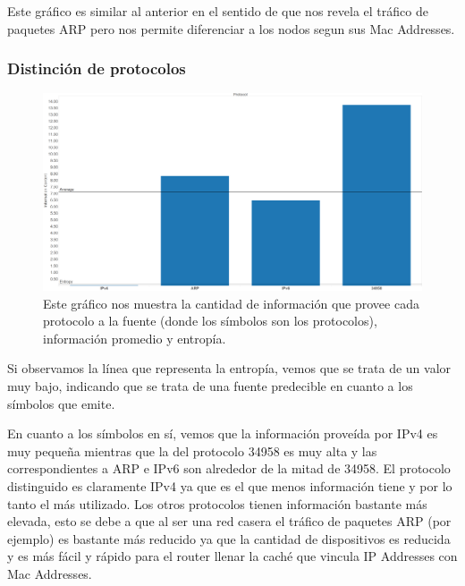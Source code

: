 \documentclass{article}
\theoremstyle{definition}
\theoremstyle{remark}
\begin{document}
Este gráfico es similar al anterior en el sentido de que nos revela el tráfico de paquetes ARP pero nos permite diferenciar a los nodos segun sus Mac Addresses.

\subsubsection{Distinción de protocolos}
\begin{figure}[H]
    \centering
    \includegraphics[width=1\textwidth]{../captures/CasaGerman/Protocol PDF Dashboard.png}
    \caption{Este gráfico nos muestra la cantidad de información que provee cada protocolo a la fuente (donde los símbolos son los protocolos), información promedio y entropía.}
    \label{fig:mesh1}
\end{figure}
Si observamos la línea que representa la entropía, vemos que se trata de un valor muy bajo, indicando que se trata de una fuente predecible en cuanto a los símbolos que emite.
\par En cuanto a los símbolos en sí, vemos que la información proveída por IPv4 es muy pequeña mientras que la del protocolo 34958 es muy alta y las correspondientes a ARP e IPv6 son alrededor de la mitad de 34958. El protocolo distinguido es claramente IPv4 ya que es el que menos información tiene y por lo tanto el más utilizado. Los otros protocolos tienen información bastante más elevada, esto se debe a que al ser una red casera el tráfico de paquetes ARP (por ejemplo) es bastante más reducido ya que la cantidad de dispositivos es reducida y es más fácil y rápido para el router llenar la caché que vincula IP Addresses con Mac Addresses.
\end{document}
